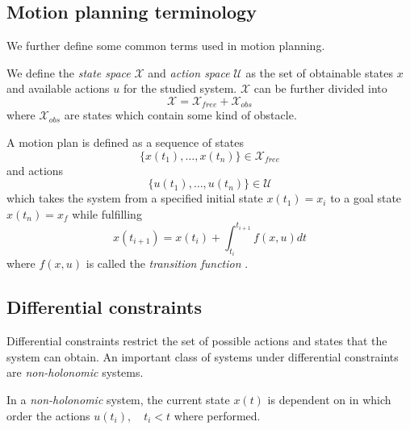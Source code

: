 \subsection{Motion planning terminology}
We further define some common terms used in motion planning.

\begin{definition}
    We define the \textit{state space} $\mathcal{X}$ and \textit{action space}
    $\mathcal{U}$ as the set of obtainable states $x$ and available actions $u$ for the
    studied system.
    $\mathcal{X}$ can be further divided into
    \begin{equation}
        \mathcal{X} = \mathcal{X}_{free} + \mathcal{X}_{obs}
    \end{equation}
    where $\mathcal{X}_{obs}$ are states which contain some kind of obstacle. 
\end{definition}

\begin{definition}
    A motion plan is defined as a sequence of states
    \begin{equation}
        \{x(t_1),\hdots, x(t_n)\}\in\mathcal{X}_{free}
    \end{equation}
    and actions
    \begin{equation}
        \{u(t_1),\hdots,u(t_n)\}\in\mathcal{U}
    \end{equation}
    which takes the system from a specified initial state $x(t_1)=x_i$ to a 
    goal state $x(t_n)=x_f$ while fulfilling
    \begin{equation}
        x(t_{i+1})=x(t_i) + \int_{t_i}^{t_{i+1}} f(x, u) dt
    \end{equation}
    where $f(x, u)$ is called the \textit{transition function} \cite{planning_algorithms}.
\end{definition}

\subsection{Differential constraints}
Differential constraints restrict the set of possible actions and states that 
the system can obtain. An important class of systems under differential constraints 
are \textit{non-holonomic} systems.

\begin{definition}
    In a \textit{non-holonomic} system, the current state $x(t)$ is dependent 
    on in which order the actions $u(t_i),\quad t_i<t$ where performed.
\end{definition}

